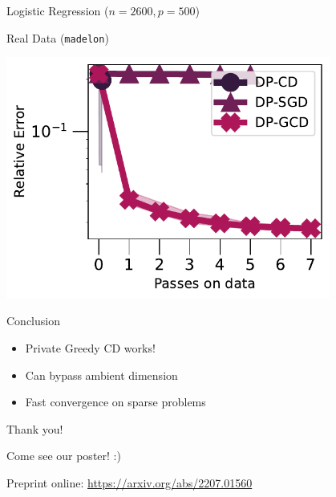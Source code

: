 \documentclass{beamer}
\begin{document}
\begin{frame}
  \begin{center}
    Logistic Regression ($n=2600, p=500$)

    Real Data (\texttt{madelon})

    \includegraphics[width=0.8\textwidth]{plots_final/madelon_l2_norm.pdf}
  \end{center}
\end{frame}

\begin{frame}
  {
    \begin{center}
      \Huge Conclusion
    \end{center}
  }

  \LARGE
  \begin{itemize}
  \item Private Greedy CD works!
  \item Can bypass ambient dimension
  \item Fast convergence on sparse problems
  \end{itemize}

\end{frame}

\begin{frame}
  \begin{center}
    \vspace{4em}

    \Huge
    Thank you!

    \vspace{2em}

    \huge
    Come see our poster! :)

    \vspace{2em}

    \large Preprint online: \url{https://arxiv.org/abs/2207.01560}
  \end{center}
\end{frame}


\end{document}

